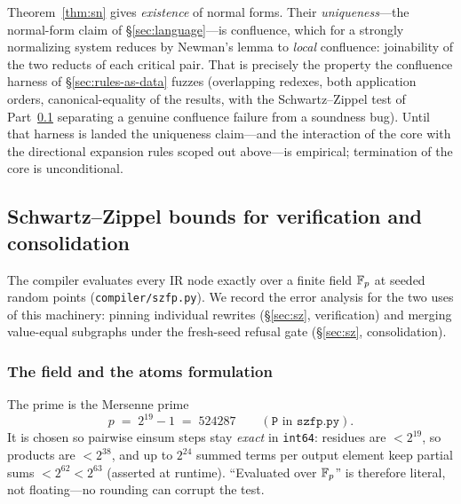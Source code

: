 \documentclass[sigplan,10pt,review]{acmart}
\begin{document}
\begin{remark}
Theorem~\ref{thm:sn} gives \emph{existence} of normal forms. Their
\emph{uniqueness}---the normal-form claim of \S\ref{sec:language}---is
confluence, which for a strongly normalizing system reduces by Newman's
lemma to \emph{local} confluence: joinability of the two reducts of each
critical pair. That is precisely the property the confluence harness of
\S\ref{sec:rules-as-data} fuzzes (overlapping redexes, both application
orders, canonical-equality of the results, with the Schwartz--Zippel test
of Part~\ref{app:sz} separating a genuine confluence failure from a
soundness bug). Until that harness is landed the uniqueness claim---and
the interaction of the core with the directional expansion rules scoped
out above---is empirical; termination of the core is unconditional.
\end{remark}

\subsection{Schwartz--Zippel bounds for verification and consolidation}
\label{app:sz}

The compiler evaluates every IR node exactly over a finite field
$\mathbb{F}_{p}$ at seeded random points (\texttt{compiler/szfp.py}). We record the
error analysis for the two uses of this machinery: pinning individual
rewrites (\S\ref{sec:sz}, verification) and merging value-equal subgraphs
under the fresh-seed refusal gate (\S\ref{sec:sz}, consolidation).

\subsubsection*{The field and the atoms formulation}

The prime is the Mersenne prime
\[
   p \;=\; 2^{19}-1 \;=\; 524287
   \qquad(\texttt{P} \text{ in } \texttt{szfp.py}).
\]
It is chosen so pairwise einsum steps stay \emph{exact} in
\texttt{int64}: residues are $<2^{19}$, so products are $<2^{38}$, and up
to $2^{24}$ summed terms per output element keep partial sums
$<2^{62}<2^{63}$ (asserted at runtime). ``Evaluated over $\mathbb{F}_{p}$'' is
therefore literal, not floating---no rounding can corrupt the test.
\end{document}
